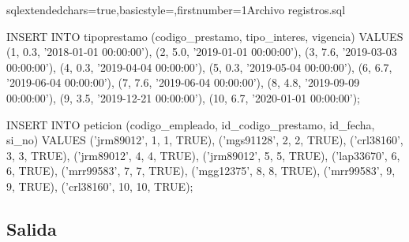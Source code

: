\begin{sourcecodep}[]{sql}{extendedchars=true,basicstyle={\fontsize{10}{10}\selectfont\ttfamily},firstnumber=1}{Archivo registros.sql}
		
		INSERT INTO tipoprestamo (codigo_prestamo, tipo_interes, vigencia)
		VALUES
		(1, 0.3, '2018-01-01 00:00:00'),
		(2, 5.0, '2019-01-01 00:00:00'),
		(3, 7.6, '2019-03-03 00:00:00'),
		(4, 0.3, '2019-04-04 00:00:00'),
		(5, 0.3, '2019-05-04 00:00:00'),
		(6, 6.7, '2019-06-04 00:00:00'),
		(7, 7.6, '2019-06-04 00:00:00'),
		(8, 4.8, '2019-09-09 00:00:00'),
		(9, 3.5, '2019-12-21 00:00:00'),
		(10, 6.7, '2020-01-01 00:00:00');
		
		
		INSERT INTO peticion (codigo_empleado, id_codigo_prestamo, id_fecha, si_no)
		VALUES
		('jrm89012', 1, 1, TRUE),
		('mgs91128', 2, 2, TRUE),
		('crl38160', 3, 3, TRUE),
		('jrm89012', 4, 4, TRUE),
		('jrm89012', 5, 5, TRUE),
		('lap33670', 6, 6, TRUE),
		('mrr99583', 7, 7, TRUE),
		('mgg12375', 8, 8, TRUE),
		('mrr99583', 9, 9, TRUE),
		('crl38160', 10, 10, TRUE);\end{sourcecodep}
	\subsection{Salida}
